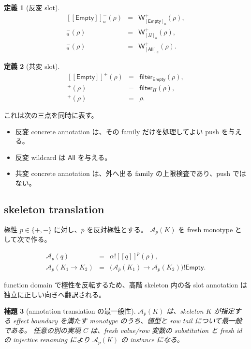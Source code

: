 \documentclass[uplatex,dvipdfmx,a4paper,10.5pt]{jsarticle}
\theoremstyle{jpplain}
\newtheorem{definition}{定義}[section]
\newtheorem{lemma}[definition]{補題}
\newcommand{\All}{\mathsf{All}}
\newcommand{\Empty}{\mathsf{Empty}}
\newcommand{\Filter}[2]{\mathsf{filter}_{#1}(#2)}
\newcommand{\PWeight}[2]{\mathsf{W}^{+}_{#1}(#2)}
\newcommand{\takeop}[2]{[#1]_{#2}}
\newcommand{\comp}{\mathbin{!}}
\newcommand{\sem}[1]{[\![#1]\!]}
\begin{document}
\begin{definition}[反変 slot]
\[
\begin{array}{rcl}
\sem{\Empty}^-_u(\rho)&=&\PWeight{\takeop{\Empty}{u}}{\rho},\\
\sem{H}^-_u(\rho)&=&\PWeight{\takeop{H}{u}}{\rho},\\
\sem{\ast}^-_u(\rho)&=&\PWeight{\takeop{\All}{u}}{\rho}.
\end{array}
\]
\end{definition}

\begin{definition}[共変 slot]
\[
\begin{array}{rcl}
\sem{\Empty}^+(\rho)&=&\Filter{\Empty}{\rho},\\
\sem{H}^+(\rho)&=&\Filter{H}{\rho},\\
\sem{\ast}^+(\rho)&=&\rho.
\end{array}
\]
\end{definition}

これは次の三点を同時に表す。

\begin{itemize}
  \item 反変 concrete annotation は、その family だけを処理してよい push を与える。
  \item 反変 wildcard は $\All$ を与える。
  \item 共変 concrete annotation は、外へ出る family の上限検査であり、push ではない。
\end{itemize}

\subsection{skeleton translation}

極性 $p\in\{+,-\}$ に対し、$\overline{p}$ を反対極性とする。
$\mathcal A_p(K)$ を fresh monotype として次で作る。

\[
\begin{array}{rcl}
\mathcal A_p(q)&=&\alpha\comp\sem{q}^p(\rho),\\
\mathcal A_p(K_1\to K_2)&=&
  \bigl(\mathcal A_{\overline p}(K_1)\to\mathcal A_p(K_2)\bigr)\comp\Empty.
\end{array}
\]

function domain で極性を反転するため、高階 skeleton 内の各 slot annotation は独立に正しい向きへ翻訳される。

\begin{lemma}[annotation translation の最一般性]
$\mathcal A_p(K)$ は、skeleton $K$ が指定する effect boundary を満たす monotype のうち、値型と row tail について最一般である。
任意の別の実現 $C$ は、fresh value/row 変数の substitution と fresh id の injective renaming により
$\mathcal A_p(K)$ の instance になる。
\end{lemma}
\end{document}
